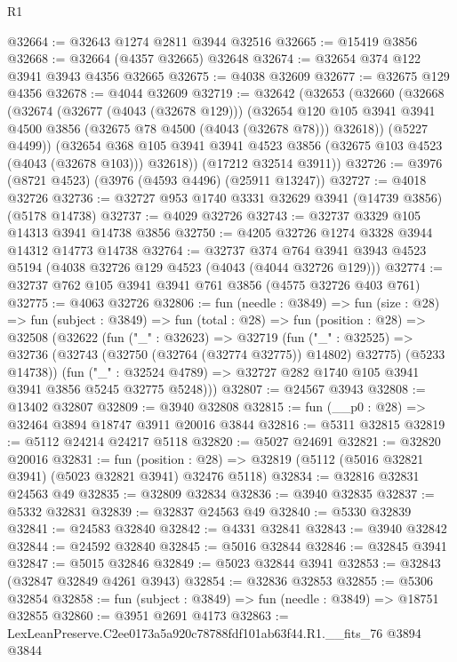 \begin{lexlean}{R1}
\begin{coremodule}
@32664 := @32643 @1274 @2811 @3944 @32516
@32665 := @15419 @3856
@32668 := @32664 (@4357 @32665) @32648
@32674 := @32654 @374 @122 @3941 @3943 @4356 @32665
@32675 := @4038 @32609
@32677 := @32675 @129 @4356
@32678 := @4044 @32609
@32719 := @32642
    (@32653
      (@32660
        (@32668
          (@32674
            (@32677 (@4043 (@32678 @129)))
            (@32654
              @120
              @105
              @3941
              @3941
              @4500
              @3856
              (@32675 @78 @4500 (@4043 (@32678 @78)))
              @32618))
          (@5227 @4499))
        (@32654 @368 @105 @3941 @3941 @4523 @3856 (@32675 @103 @4523 (@4043 (@32678 @103))) @32618))
      (@17212 @32514 @3911))
@32726 := @3976 (@8721 @4523) (@3976 (@4593 @4496) (@25911 @13247))
@32727 := @4018 @32726
@32736 := @32727 @953 @1740 @3331 @32629 @3941 (@14739 @3856) (@5178 @14738)
@32737 := @4029 @32726
@32743 := @32737 @3329 @105 @14313 @3941 @14738 @3856
@32750 := @4205 @32726 @1274 @3328 @3944 @14312 @14773 @14738
@32764 := @32737
    @374
    @764
    @3941
    @3943
    @4523
    @5194
    (@4038 @32726 @129 @4523 (@4043 (@4044 @32726 @129)))
@32774 := @32737 @762 @105 @3941 @3941 @761 @3856 (@4575 @32726 @403 @761)
@32775 := @4063 @32726
@32806 := fun (needle : @3849) =>
  fun (size : @28) =>
  fun (subject : @3849) =>
  fun (total : @28) =>
  fun (position : @28) =>
  @32508
    (@32622
      (fun ("_" : @32623) =>
      @32719
        (fun ("_" : @32525) =>
        @32736 (@32743 (@32750 (@32764 (@32774 @32775)) @14802) @32775) (@5233 @14738))
        (fun ("_" : @32524 @4789) => @32727 @282 @1740 @105 @3941 @3941 @3856 @5245 @32775 @5248)))
@32807 := @24567 @3943
@32808 := @13402 @32807
@32809 := @3940 @32808
@32815 := fun (__p0 : @28) => @32464 @3894 @18747 @3911 @20016 @3844
@32816 := @5311 @32815
@32819 := @5112 @24214 @24217 @5118
@32820 := @5027 @24691
@32821 := @32820 @20016
@32831 := fun (position : @28) =>
  @32819 (@5112 (@5016 @32821 @3941) (@5023 @32821 @3941) @32476 @5118)
@32834 := @32816 @32831 @24563 @49
@32835 := @32809 @32834
@32836 := @3940 @32835
@32837 := @5332 @32831
@32839 := @32837 @24563 @49
@32840 := @5330 @32839
@32841 := @24583 @32840
@32842 := @4331 @32841
@32843 := @3940 @32842
@32844 := @24592 @32840
@32845 := @5016 @32844
@32846 := @32845 @3941
@32847 := @5015 @32846
@32849 := @5023 @32844 @3941
@32853 := @32843 (@32847 @32849 @4261 @3943)
@32854 := @32836 @32853
@32855 := @5306 @32854
@32858 := fun (subject : @3849) => fun (needle : @3849) => @18751 @32855
@32860 := @3951 @2691 @4173
@32863 := LexLeanPreserve.C2ee0173a5a920c78788fdf101ab63f44.R1.__fits_76 @3894 @3844

\end{coremodule}
\end{lexlean}
